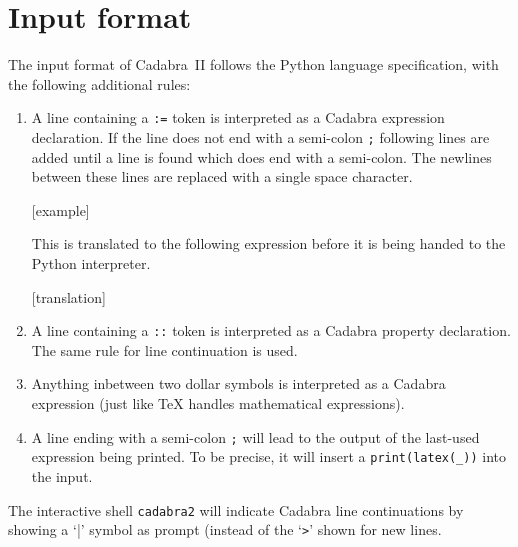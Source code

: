 \section{Input format}

The input format of Cadabra~II follows the Python language
specification, with the following additional rules:
\begin{enumerate}
\item A line containing a \verb|:=| token is interpreted as a Cadabra
  expression declaration. If the line does not end with a semi-colon
  \verb|;| following lines are added until a line is found which does
  end with a semi-colon. The newlines between these lines are replaced
  with a single space character.

  [example]

  This is translated to the following expression before it is being
  handed to the Python interpreter.

  [translation]

\item A line containing a \verb|::| token is interpreted as a Cadabra
  property declaration. The same rule for line continuation is used.

\item Anything inbetween two dollar symbols is interpreted as a
  Cadabra expression (just like \TeX{} handles mathematical
  expressions).

\item A line ending with a semi-colon \verb|;| will lead to the output
  of the last-used expression being printed. To be precise, it will
  insert a \verb|print(latex(_))| into the input.
\end{enumerate}
The interactive shell \verb|cadabra2| will indicate Cadabra line
continuations by showing a `|' symbol as prompt (instead of the
`\verb|>|' shown for new lines.
